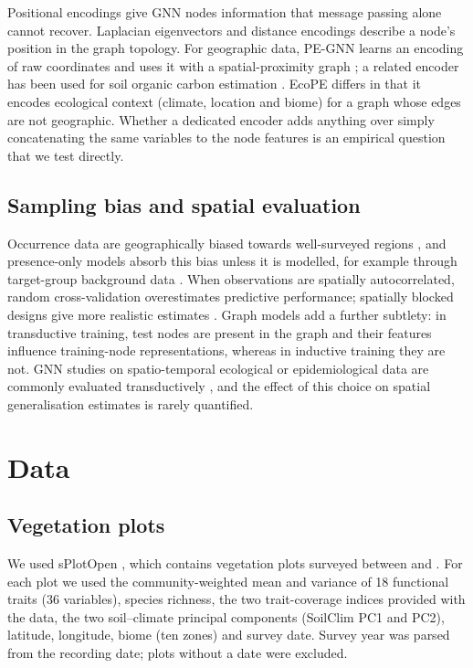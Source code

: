 \documentclass[a4paper,fleqn]{cas-sc}
\begin{document}
Positional encodings give GNN nodes information that message passing alone cannot recover. Laplacian eigenvectors \citep{dwivedi2020} and distance encodings \citep{li2020} describe a node's position in the graph topology. For geographic data, PE-GNN learns an encoding of raw coordinates and uses it with a spatial-proximity graph \citep{klemmer2023pegnn}; a related encoder has been used for soil organic carbon estimation \citep{zhao2023}. EcoPE differs in that it encodes ecological context (climate, location and biome) for a graph whose edges are not geographic. Whether a dedicated encoder adds anything over simply concatenating the same variables to the node features is an empirical question that we test directly.

\subsection{Sampling bias and spatial evaluation}

Occurrence data are geographically biased towards well-surveyed regions \citep{beck2014}, and presence-only models absorb this bias unless it is modelled, for example through target-group background data \citep{phillips2009}. When observations are spatially autocorrelated, random cross-validation overestimates predictive performance; spatially blocked designs give more realistic estimates \citep{roberts2017,valavi2019,ploton2020}. Graph models add a further subtlety: in transductive training, test nodes are present in the graph and their features influence training-node representations, whereas in inductive training they are not. GNN studies on spatio-temporal ecological or epidemiological data are commonly evaluated transductively \citep[e.g.][]{croft2023}, and the effect of this choice on spatial generalisation estimates is rarely quantified.

\section{Data}
\label{sec:data}

\subsection{Vegetation plots}

We used sPlotOpen \citep{sabatini2021,splotdata}, which contains \nPlotsTotal{} vegetation plots surveyed between \surveyYearMin{} and \surveyYearMax{}. For each plot we used the community-weighted mean and variance of 18 functional traits (36 variables), species richness, the two trait-coverage indices provided with the data, the two soil--climate principal components (SoilClim PC1 and PC2), latitude, longitude, biome (ten zones) and survey date. Survey year was parsed from the recording date; \nPlotsNoDate{} plots without a date were excluded.
\end{document}
